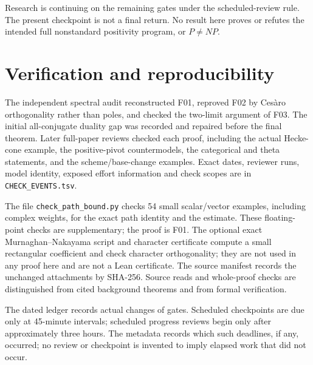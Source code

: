 Research is continuing on the remaining gates under the scheduled-review rule. The present checkpoint is not a final return. No result here proves or refutes the intended full nonstandard positivity program, or $P\ne NP$.

\appendix
\section{Verification and reproducibility}
The independent spectral audit reconstructed F01, reproved F02 by Ces\`aro orthogonality rather than poles, and checked the two-limit argument of F03. The initial all-conjugate duality gap was recorded and repaired before the final theorem. Later full-paper reviews checked each proof, including the actual Hecke-cone example, the positive-pivot countermodels, the categorical and theta statements, and the scheme/base-change examples. Exact dates, reviewer runs, model identity, exposed effort information and check scopes are in \texttt{CHECK\_EVENTS.tsv}.

The file \texttt{check\_path\_bound.py} checks 54 small scalar/vector examples, including complex weights, for the exact path identity and the estimate. These floating-point checks are supplementary; the proof is F01. The optional exact Murnaghan--Nakayama script and character certificate compute a small rectangular coefficient and check character orthogonality; they are not used in any proof here and are not a Lean certificate. The source manifest records the unchanged attachments by SHA-256. Source reads and whole-proof checks are distinguished from cited background theorems and from formal verification.

The dated ledger records actual changes of gates. Scheduled checkpoints are due only at 45-minute intervals; scheduled progress reviews begin only after approximately three hours. The metadata records which such deadlines, if any, occurred; no review or checkpoint is invented to imply elapsed work that did not occur.


